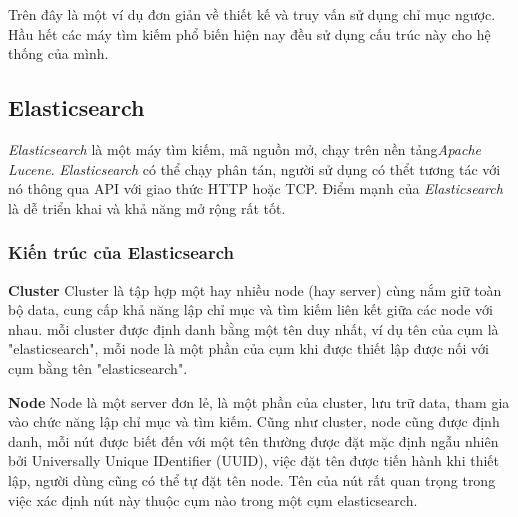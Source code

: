 Trên đây là một ví dụ đơn giản về thiết kế và truy vấn sử dụng chỉ mục ngược. Hầu hết các máy tìm kiếm phổ biến hiện nay đều sử dụng cấu trúc này cho hệ thống của mình.

\subsection{Elasticsearch}
\textit{Elasticsearch} là một máy tìm kiếm, mã nguồn mở, chạy trên nền tảng\textit{Apache Lucene}. \textit{Elasticsearch} có thể chạy phân tán, người sử dụng có thểt tương tác với nó thông qua API với giao thức HTTP hoặc TCP. Điểm mạnh của \textit{Elasticsearch} là dễ triển khai và khả năng mở rộng rất tốt.
\subsubsection{Kiến trúc của Elasticsearch}

\textbf{Cluster} Cluster là tập hợp một hay nhiều node (hay server) cùng nắm giữ toàn bộ data, cung cấp khả năng lập chỉ mục và tìm kiếm liên kết giữa các node với nhau. mỗi cluster được định danh bằng một tên duy nhất, ví dụ tên của cụm là "elasticsearch", mỗi node là một phần của cụm khi được thiết lập được nối với cụm bằng tên "elasticsearch". 

\textbf{Node} Node là một server đơn lẻ, là một phần của cluster, lưu trữ data, tham gia vào chức năng lập chỉ mục và tìm kiếm. Cũng như cluster, node cũng được định danh, mỗi nút được biết đến với một tên thường được đặt mặc định ngẫu nhiên bởi Universally Unique IDentifier (UUID), việc đặt tên được tiến hành khi thiết lập, người dùng cũng có thể tự đặt tên node. Tên của nút rất quan trọng trong việc xác định nút này thuộc cụm nào trong một cụm elasticsearch.

